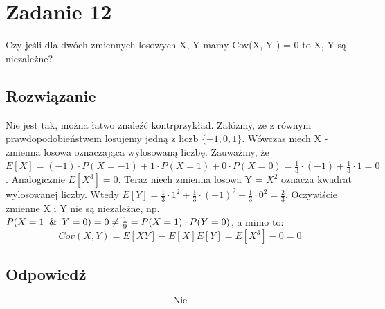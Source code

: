 \section{Zadanie 12}
Czy jeśli dla dwóch zmiennych losowych X, Y mamy Cov(X, Y ) = 0 to
X, Y są niezależne?

\subsection*{Rozwiązanie}
Nie jest tak, można łatwo znaleźć kontrprzykład. Załóżmy, że z równym prawdopodobieństwem losujemy jedną z liczb \(\{-1,0,1\}\). Wówczas niech X - zmienna losowa oznaczająca wylosowaną liczbę. Zauważmy, że \(E[X] = (-1)\cdot P(X=-1) + 1\cdot P(X=1) + 0\cdot P(X = 0)= \frac{1}{3}\cdot (-1) + \frac{1}{3} \cdot 1 = 0\). Analogicznie \(E[X^3] = 0\). Teraz niech zmienna losowa Y = \(X^2\) oznacza kwadrat wylosowanej liczby. Wtedy \(E[Y] = \frac{1}{3}\cdot 1^2 + \frac{1}{3} \cdot (-1)^2  + \frac{1}{3} \cdot 0^2= \frac{2}{3}\). Oczywiście zmienne X i Y nie są niezależne, np. \(P(X=1 \And Y=0) = 0 \neq \frac{1}{9} =  P(X = 1) \cdot P(Y = 0)\), a mimo to:
\[
	Cov(X,Y) = E[XY] - E[X]E[Y] = E[X^3] - 0 = 0
\]


\subsection*{Odpowiedź}
\[
	\boxed{\text{Nie}}
\]
